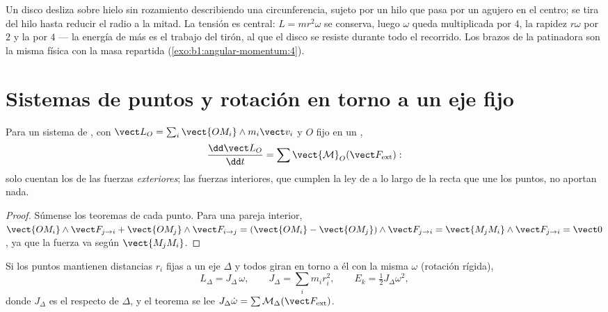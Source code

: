 \begin{example}\label{ex:b1:angular-momentum:puck}
Un disco desliza sobre hielo sin rozamiento describiendo una
circunferencia, sujeto por un hilo que pasa por un agujero en el centro;
se tira del hilo hasta reducir el radio a la mitad. La tensión es central:
$L = mr^2\omega$ se conserva, luego $\omega$ queda multiplicada por $4$, la
rapidez $r\omega$ por $2$ y la  por $4$ --- la energía de
más es el trabajo del tirón, al que el disco se resiste durante todo el
recorrido. Los brazos de la patinadora son la misma física con la masa
repartida (\cref{exo:b1:angular-momentum:4}).
\end{example}

\section{Sistemas de puntos y rotación en torno a un eje fijo}

\begin{theorem}\label{thm:b1:angular-momentum:system}
Para un sistema de , con $\vect L_O = \sum_i\vect{OM_i}\wedge m_i\vect v_i$
y $O$ fijo en un ,
\[
\frac{\dd\vect L_O}{\dd t} = \sum\vect{\mathcal M}_O(\vect F_{\mathrm{ext}}):
\]
solo cuentan los  de las fuerzas \emph{exteriores}; las fuerzas
interiores, que cumplen la ley de  a lo largo de la recta
que une los puntos, no aportan nada.
\end{theorem}

\begin{proof}
Súmense los teoremas de cada punto. Para una pareja interior, $\vect{OM_i}\wedge\vect F_{j\to i}
+ \vect{OM_j}\wedge\vect F_{i\to j} = (\vect{OM_i} - \vect{OM_j})\wedge\vect F_{j\to i}
= \vect{M_jM_i}\wedge\vect F_{j\to i} = \vect 0$, ya que la fuerza va
según $\vect{M_jM_i}$.
\end{proof}

\begin{proposition}\label{prop:b1:angular-momentum:inertia}
Si los puntos mantienen distancias $r_i$ fijas a un eje $\Delta$ y todos
giran en torno a él con la misma  $\omega$ (rotación rígida),
\[
L_\Delta = J_\Delta\,\omega, \qquad J_\Delta = \sum_i m_ir_i^2, \qquad
E_k = \tfrac12 J_\Delta\omega^2,
\]
donde $J_\Delta$ es el \emph{} respecto de $\Delta$, y el
teorema se lee $J_\Delta\dot\omega = \sum\mathcal M_\Delta(\vect F_{\mathrm{ext}})$.
\end{proposition}

